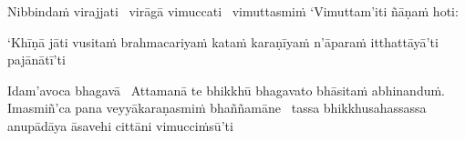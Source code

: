 \begin{pali-hang}
  Nibbindaṁ virajjati \breathmark\ virāgā vimuccati \breathmark\ vimuttasmiṁ `Vimuttam'iti ñāṇaṁ hoti:
\end{pali-hang}

\begin{pali-hang}
  `Khīṇā jāti vusitaṁ brahmacariyaṁ kataṁ karaṇīyaṁ n'āparaṁ itthattāyā'ti pajānātī'ti
\end{pali-hang}

\begin{pali-hang}
  Idam'avoca bhagavā \breathmark\ Attamanā te bhikkhū bhagavato bhāsitaṁ abhinanduṁ. Imasmiñ'ca pana veyyākaraṇasmiṁ bhaññamāne \breathmark\ tassa bhikkhusahassassa anupādāya āsavehi cittāni vimucciṁsū'ti
\end{pali-hang}

\suttaRef{[SN 35.28]}

